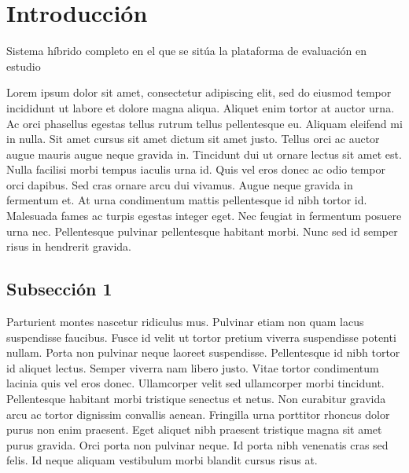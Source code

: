 \section{Introducción}

\vspace{0.5cm}

\Large\scshape
\begin{center}
    Sistema híbrido completo en el que se sitúa la plataforma de evaluación en estudio
\end{center}
\normalfont


\divider

Lorem ipsum dolor sit amet, consectetur adipiscing elit, sed do eiusmod tempor incididunt ut labore et dolore magna aliqua. Aliquet enim tortor at auctor urna. Ac orci phasellus egestas tellus rutrum tellus pellentesque eu. Aliquam eleifend mi in nulla. Sit amet cursus sit amet dictum sit amet justo. Tellus orci ac auctor augue mauris augue neque gravida in. Tincidunt dui ut ornare lectus sit amet est. Nulla facilisi morbi tempus iaculis urna id. Quis vel eros donec ac odio tempor orci dapibus. Sed cras ornare arcu dui vivamus. Augue neque gravida in fermentum et. At urna condimentum mattis pellentesque id nibh tortor id. Malesuada fames ac turpis egestas integer eget. Nec feugiat in fermentum posuere urna nec. Pellentesque pulvinar pellentesque habitant morbi. Nunc sed id semper risus in hendrerit gravida.\\

\subsection{Subsección 1}

Parturient montes nascetur ridiculus mus. Pulvinar etiam non quam lacus suspendisse faucibus. Fusce id velit ut tortor pretium viverra suspendisse potenti nullam. Porta non pulvinar neque laoreet suspendisse. Pellentesque id nibh tortor id aliquet lectus. Semper viverra nam libero justo. Vitae tortor condimentum lacinia quis vel eros donec. Ullamcorper velit sed ullamcorper morbi tincidunt. Pellentesque habitant morbi tristique senectus et netus. Non curabitur gravida arcu ac tortor dignissim convallis aenean. Fringilla urna porttitor rhoncus dolor purus non enim praesent. Eget aliquet nibh praesent tristique magna sit amet purus gravida. Orci porta non pulvinar neque. Id porta nibh venenatis cras sed felis. Id neque aliquam vestibulum morbi blandit cursus risus at.\\

